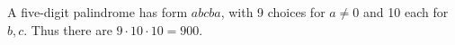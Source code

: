 A five-digit palindrome has form $abcba$, with 9 choices for $a\ne0$ and 10 each for $b,c$. Thus there are $9\cdot10\cdot10=\boxed{900}$.
